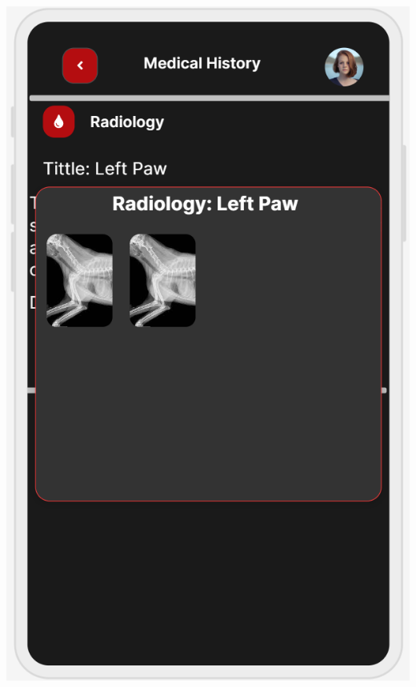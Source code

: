 \documentclass[14pt]{beamer}
\begin{document}
\begin{frame}
\begin{columns}
\begin{column}{0.5\textwidth}
\begin{center}
\includegraphics[scale = 0.48]{Images/HistoryP.PNG}

\end{center}
\end{column}
\end{columns}


\end{frame}
\end{document}
